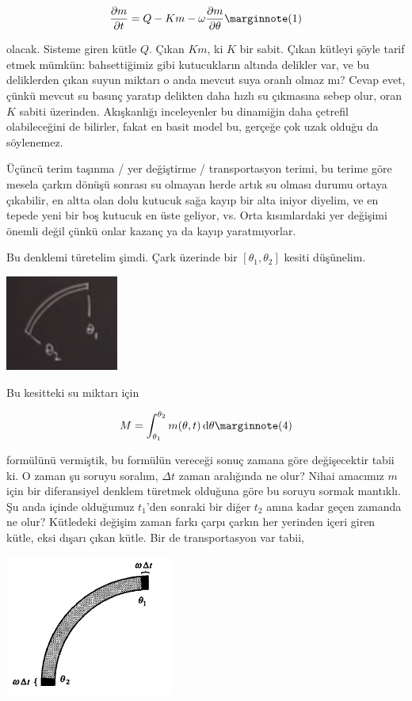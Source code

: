 \documentclass[12pt,fleqn]{article}\usepackage{../../common}
\begin{document}
$$ 
\frac{\partial m}{\partial t} = Q - Km - \omega \frac{\partial m}{\partial \theta}
\mlabel{1}
$$

olacak. Sisteme giren kütle $Q$. Çıkan $Km$, ki $K$ bir sabit. Çıkan
kütleyi şöyle tarif etmek mümkün: bahsettiğimiz gibi kutucukların altında
delikler var, ve bu deliklerden çıkan suyun miktarı o anda mevcut suya
oranlı olmaz mı?  Cevap evet, çünkü mevcut su basınç yaratıp delikten daha
hızlı su çıkmasına sebep olur, oran $K$ sabiti üzerinden. Akışkanlığı
inceleyenler bu dinamiğin daha çetrefil olabileceğini de bilirler, fakat en
basit model bu, gerçeğe çok uzak olduğu da söylenemez.

Üçüncü terim taşınma / yer değiştirme / transportasyon terimi, bu terime
göre mesela çarkın dönüşü sonrası su olmayan herde artık su olması durumu
ortaya çıkabilir, en altta olan dolu kutucuk sağa kayıp bir alta iniyor
diyelim, ve en tepede yeni bir boş kutucuk en üste geliyor, vs. Orta
kısımlardaki yer değişimi önemli değil çünkü onlar kazanç ya da kayıp
yaratmıyorlar.

Bu denklemi türetelim şimdi. Çark üzerinde bir $[\theta_1,\theta_2]$ kesiti
düşünelim.

\includegraphics[width=10em]{15_03.png}

Bu kesitteki su miktarı için

$$ 
M = \int_{\theta_1}^{\theta_2} m(\theta, t) \ud\theta 
\mlabel{4}
$$
 
formülünü vermiştik, bu formülün vereceği sonuç zamana göre değişecektir
tabii ki. O zaman şu soruyu soralım, $\Delta t$ zaman aralığında ne olur?
Nihai amacımız $m$ için bir diferansiyel denklem türetmek olduğuna göre bu
soruyu sormak mantıklı. Şu anda içinde olduğumuz $t_1$'den sonraki bir
diğer $t_2$ anına kadar geçen zamanda ne olur? Kütledeki değişim zaman
farkı çarpı çarkın her yerinden içeri giren kütle, eksi dışarı çıkan
kütle. Bir de transportasyon var tabii,

\includegraphics[width=15em]{15_04.png}
\end{document}
